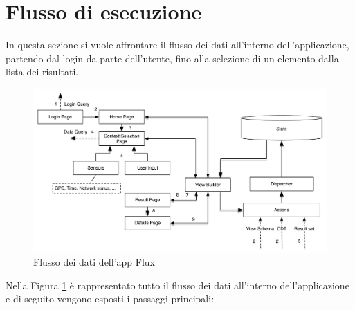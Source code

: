 \section{Flusso di esecuzione}

In questa sezione si vuole affrontare il flusso dei dati all'interno dell'applicazione, partendo dal login da parte dell'utente, fino alla selezione di un elemento dalla lista dei risultati.
\begin{figure}[ht]
	\centering
	\includegraphics[width=\textwidth]{6-implementazione-app/immagini/app_dataflow.pdf}
	\caption{Flusso dei dati dell'app Flux}\label{fig:app-dataflow}
\end{figure}
Nella Figura \ref{fig:app-dataflow} è rappresentato tutto il flusso dei dati all'interno dell'applicazione e di seguito vengono esposti i passaggi principali:
